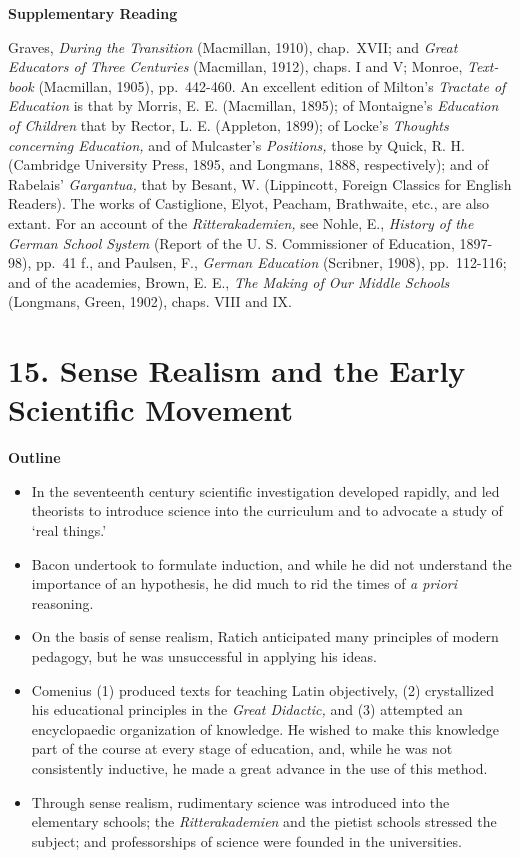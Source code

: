 \documentclass[
]{book}
\providecommand{\tightlist}{%
  \setlength{\itemsep}{0pt}\setlength{\parskip}{0pt}}
\begin{document}
\textbf{Supplementary Reading}

Graves, \emph{During the Transition} (Macmillan, 1910), chap.~XVII; and \emph{Great Educators of Three Centuries} (Macmillan, 1912), chaps. I and V; Monroe, \emph{Text-book} (Macmillan, 1905), pp.~442-460. An excellent edition of Milton's \emph{Tractate of Education} is that by Morris, E. E. (Macmillan, 1895); of Montaigne's \emph{Education of Children} that by Rector, L. E. (Appleton, 1899); of Locke's \emph{Thoughts concerning Education,} and of Mulcaster's \emph{Positions,} those by Quick, R. H. (Cambridge University Press, 1895, and Longmans, 1888, respectively); and of Rabelais' \emph{Gargantua,} that by Besant, W. (Lippincott, Foreign Classics for English Readers). The works of Castiglione, Elyot, Peacham, Brathwaite, etc., are also extant. For an account of the \emph{Ritterakademien,} see Nohle, E., \emph{History of the German School System} (Report of the U. S. Commissioner of Education, 1897-98), pp.~41 f., and Paulsen, F., \emph{German Education} (Scribner, 1908), pp.~112-116; and of the academies, Brown, E. E., \emph{The Making of Our Middle Schools} (Longmans, Green, 1902), chaps. VIII and IX.

\hypertarget{sense-realism-and-the-early-scientific-movement}{%
\chapter{15. Sense Realism and the Early Scientific Movement}\label{sense-realism-and-the-early-scientific-movement}}

\textbf{Outline}

\begin{itemize}
\tightlist
\item
  In the seventeenth century scientific investigation developed rapidly, and led theorists to introduce science into the curriculum and to advocate a study of `real things.'
\item
  Bacon undertook to formulate induction, and while he did not understand the importance of an hypothesis, he did much to rid the times of \emph{a priori} reasoning.
\item
  On the basis of sense realism, Ratich anticipated many principles of modern pedagogy, but he was unsuccessful in applying his ideas.
\item
  Comenius (1) produced texts for teaching Latin objectively, (2) crystallized his educational principles in the \emph{Great Didactic,} and (3) attempted an encyclopaedic organization of knowledge. He wished to make this knowledge part of the course at every stage of education, and, while he was not consistently inductive, he made a great advance in the use of this method.
\item
  Through sense realism, rudimentary science was introduced into the elementary schools; the \emph{Ritterakademien} and the pietist schools stressed the subject; and professorships of science were founded in the universities.
\end{itemize}
\end{document}

